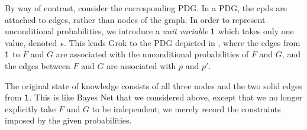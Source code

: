 \documentclass[the-pdg-manual.tex]{subfiles}
\begin{document}
\begin{example}
By way of contrast, consider the corresponding PDG. In a PDG, the cpds are
attached to edges, rather than nodes of the graph.
%
In order to represent unconditional probabilities, we introduce
a \emph{unit variable} $\mathsf{1}$ which 
takes only one value, denoted
$\star$. 
This leads Grok to 
the PDG depicted in ,
where the edges from $\mathsf{1}$ to $F$ and $G$ are associated with the
unconditional probabilities of $F$ and $G$, and the 
edges between $F$ and $G$ are associated with $p$ and $p'$.



The original state of knowledge consists of all three nodes and the two
solid
edges from $\mathsf{1}$. This is like Bayes Net that we considered above,
except that we 
no longer
explicitly
%
take  $F$ and $G$ to be independent; we merely record the constraints
imposed by the given probabilities.  
	

\end{example}
\end{document}
